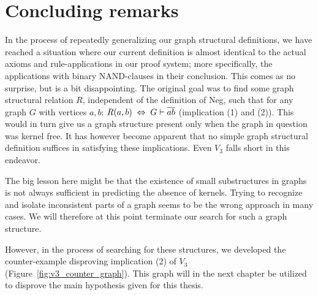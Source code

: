 \section{Concluding remarks}
\label{sec:Concluding remarks}
In the process of repeatedly generalizing our graph structural definitions, we have reached a situation where our current definition is almost identical to the actual axioms and rule-applications in our proof system; more specifically, the applications with binary NAND-clauses in their conclusion.
This comes as no surprise, but is a bit disappointing.
The original goal was to find some graph structural relation $R$, independent of the definition of Neg, such that for any graph $G$ with vertices $a,b$: $R(a,b) \; \Leftrightarrow \; G\vdash \ol{ab}$ (implication (1) and (2)).
This would in turn give us a graph structure present only when the graph in question was kernel free.
It has however become apparent that no simple graph structural definition suffices in satisfying these implications.
Even $V_3$ falls short in this endeavor.

The big lesson here might be that the existence of small substructures in graphs is not always sufficient in predicting the absence of kernels.
Trying to recognize and isolate inconsistent parts of a graph seems to be the wrong approach in many cases.
We will therefore at this point terminate our search for such a graph structure.

However, in the process of searching for these structures, we developed the counter-example disproving implication (2) of $V_3$ (Figure~\ref{fig:v3_counter_graph}).
This graph will in the next chapter be utilized to disprove the main hypothesis given for this thesis.

